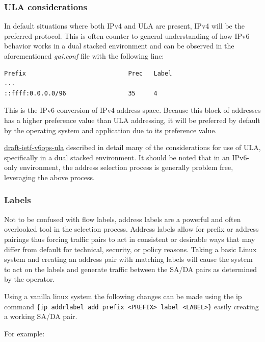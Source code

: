 \documentclass[
]{article}
\begin{document}
\subsubsection{ULA considerations}\label{ula-considerations}

In default situations where both IPv4 and ULA are present, IPv4 will be
the preferred protocol. This is often counter to general understanding
of how IPv6 behavior works in a dual stacked environment and can be
observed in the aforementioned \emph{gai.conf} file with the following
line:

\begin{verbatim}
Prefix                            Prec   Label      
...
::ffff:0.0.0.0/96                 35     4
\end{verbatim}

This is the IPv6 conversion of IPv4 address space. Because this block of
addresses has a higher preference value than ULA addressing, it will be
preferred by default by the operating system and application due to its
preference value.

\href{https://datatracker.ietf.org/doc/draft-ietf-v6ops-ula/}{draft-ietf-v6ops-ula}
described in detail many of the considerations for use of ULA,
specifically in a dual stacked environment. It should be noted that in
an IPv6-only environment, the address selection process is generally
problem free, leveraging the above process.

\subsubsection{Labels}\label{labels}

Not to be confused with flow labels, address labels are a powerful and
often overlooked tool in the selection process. Address labels allow for
prefix or address pairings thus forcing traffic pairs to act in
consistent or desirable ways that may differ from default for technical,
security, or policy reasons. Taking a basic Linux system and creating an
address pair with matching labels will cause the system to act on the
labels and generate traffic between the SA/DA pairs as determined by the
operator.

Using a vanilla linux system the following changes can be made using the
ip command
\texttt{\{ip\ addrlabel\ add\ prefix\ \textless{}PREFIX\textgreater{}\ label\ \textless{}LABEL\textgreater{}\}}
easily creating a working SA/DA pair.

For example:
\end{document}
